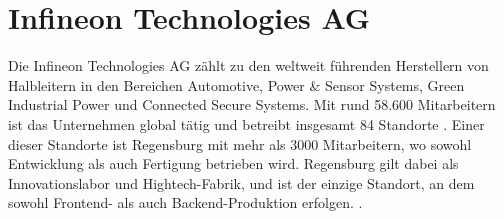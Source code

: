 \section{Infineon Technologies AG}

Die Infineon Technologies AG zählt zu den weltweit führenden Herstellern von Halbleitern in den Bereichen Automotive, Power \& Sensor Systems, Green Industrial Power und Connected Secure Systems. Mit rund 58.600 Mitarbeitern ist das Unternehmen global tätig und betreibt insgesamt 84 Standorte \cite{infineon2024unternehmenspraesentation}. Einer dieser Standorte ist Regensburg mit mehr als 3000 Mitarbeitern, wo sowohl Entwicklung als auch Fertigung betrieben wird. Regensburg gilt dabei als Innovationslabor und Hightech-Fabrik, und ist der einzige Standort, an dem sowohl Frontend- als auch Backend-Produktion erfolgen. \cite{infineon2024regensburg}.
